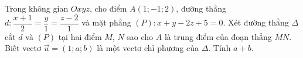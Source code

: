 \begin{ex}
Trong không gian $Oxyz$, cho điểm $A(1;-1;2)$, đường thẳng $d:\dfrac{x+1}{2}=\dfrac y1=\dfrac{z-2}{1}$ và mặt phẳng $(P):x+y-2z+5=0$. Xét đường thẳng $\Delta$ cắt $d$ và $(P)$ tại hai điểm $M$, $N$ sao cho $A$ là trung điểm của đoạn thẳng $MN$. Biết vectơ $\vec u=(1;a;b)$ là một vectơ chỉ phương của $\Delta$. Tính $a+b$.
\end{ex}
